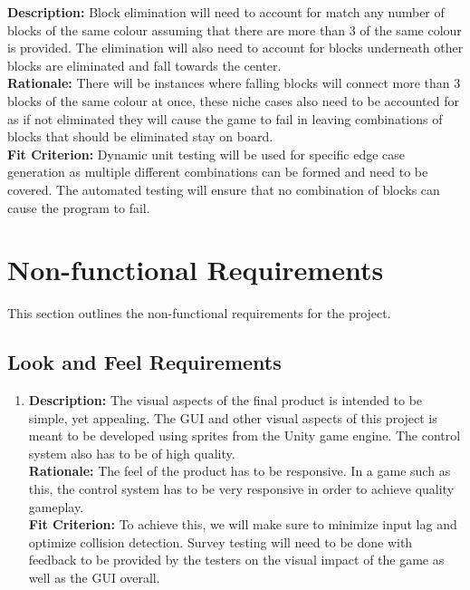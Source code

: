 \documentclass[12pt, titlepage]{article}
\begin{document}
\begin{enumerate}[label=F\arabic*]
{\item \textbf{Description:} Block elimination will need to account for match any number of blocks of the same colour assuming that there are more than 3 of the same colour is provided. The elimination will also need to account for blocks underneath other blocks are eliminated and fall towards the center.\\
\textbf{Rationale:} There will be instances where falling blocks will connect more than 3 blocks of the same colour at once, these niche cases also need to be accounted for as if not eliminated they will cause the game to fail in leaving combinations of blocks that should be eliminated stay on board.\\
\textbf{Fit Criterion:} Dynamic unit testing will be used for specific edge case generation as multiple different combinations can be formed and need to be covered. The automated testing will ensure that no combination of blocks can cause the program to fail.
}%

\end{enumerate}


\section{Non-functional Requirements}
This section outlines the non-functional requirements for the project.



\subsection{Look and Feel Requirements}
\begin{enumerate}[label=LF\arabic*]
\item \textbf{Description:} The visual aspects of the final product is intended to be simple, yet appealing. The GUI and other visual aspects of this project is meant to be developed using sprites from the Unity game engine. The control system also has to be of high quality.\\
\textbf{Rationale:} The feel of the product has to be responsive. In a game such as this, the control system has to be very responsive in order to achieve quality gameplay.\\
\textbf{Fit Criterion:} To achieve this, we will make sure to minimize input lag and optimize collision detection. {\color{blue}Survey testing will need to be done with feedback to be provided by the testers on the visual impact of the game as well as the GUI overall.}

\end{enumerate}
\end{document}
